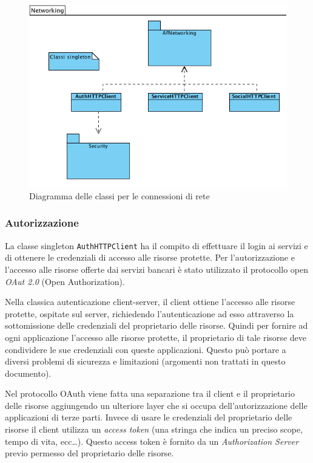\begin{figure}[!htbp]
\centering
\includegraphics[scale=0.70]{architettura/networkingClass.png}
\caption{Diagramma delle classi per le connessioni di rete}
\end{figure}

\subsubsection{Autorizzazione}

La classe singleton \texttt{AuthHTTPClient} ha il compito di effettuare il login ai servizi e di ottenere le credenziali di accesso alle risorse protette. Per l'autorizzazione e  l’accesso alle risorse offerte dai servizi bancari è stato utilizzato il protocollo open \emph{OAut 2.0} (Open Authorization).

Nella classica autenticazione client-server, il client ottiene l’accesso alle risorse protette, ospitate sul server, richiedendo l’autenticazione ad esso attraverso la sottomissione delle credenziali del proprietario delle risorse. Quindi per fornire ad ogni applicazione l’accesso alle risorse protette, il proprietario di tale risorse deve condividere le sue credenziali con queste applicazioni. Questo può portare a diversi problemi di sicurezza e limitazioni (argomenti non trattati in questo documento).
 
Nel protocollo OAuth viene fatta una separazione tra il client e il proprietario delle risorse aggiungendo un ulteriore layer che si occupa dell’autorizzazione delle applicazioni di terze parti.
Invece di usare le credenziali del proprietario delle risorse il client utilizza un \emph{access token} (una stringa che indica un preciso scope, tempo di vita, ecc\dots).
Questo access token è fornito da un \emph{Authorization Server} previo permesso del proprietario delle risorse.

